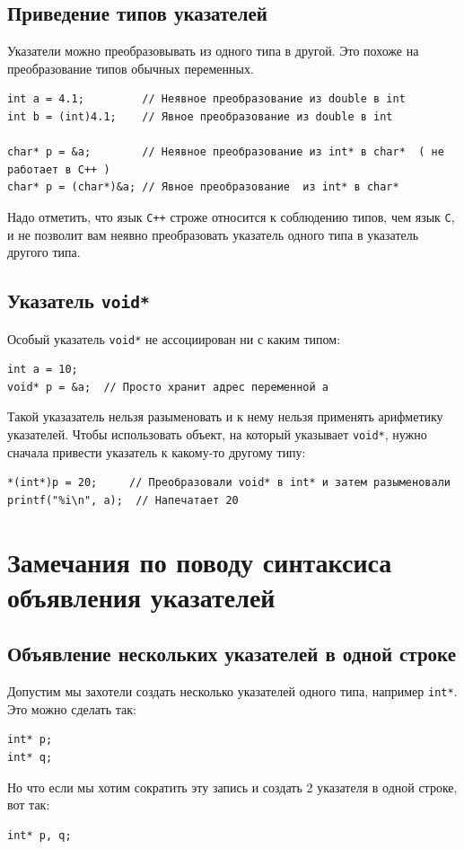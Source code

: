 \documentclass{article}
\begin{document}
\subsection*{Приведение типов указателей}
Указатели можно преобразовывать из одного типа в другой. Это похоже на преобразование типов обычных переменных.
\begin{lstlisting}
int a = 4.1;         // Неявное преобразование из double в int
int b = (int)4.1;    // Явное преобразование из double в int

char* p = &a;        // Неявное преобразование из int* в char*  ( не работает в C++ )
char* p = (char*)&a; // Явное преобразование  из int* в char*
\end{lstlisting}
Надо отметить, что язык \texttt{C++} строже относится к соблюдению типов, чем язык \texttt{C}, и не позволит вам неявно преобразовать указатель одного типа в указатель другого типа.


\subsection*{Указатель \texttt{void*}}
Особый указатель \texttt{void*} не ассоциирован ни с каким типом:
\begin{lstlisting}
int a = 10;
void* p = &a;  // Просто хранит адрес переменной a
\end{lstlisting}
Такой указазатель нельзя разыменовать и к нему нельзя применять арифметику указателей.
Чтобы использовать объект, на который указывает \texttt{void*}, нужно сначала привести указатель к какому-то другому типу:
\begin{lstlisting}
*(int*)p = 20;     // Преобразовали void* в int* и затем разыменовали
printf("%i\n", a);  // Напечатает 20
\end{lstlisting}



\newpage
\section*{Замечания по поводу синтаксиса объявления указателей}
\subsection*{Объявление нескольких указателей в одной строке}
Допустим мы захотели создать несколько указателей одного типа, например \texttt{int*}. Это можно сделать так:
\begin{lstlisting}
int* p;
int* q;
\end{lstlisting}
Но что если мы хотим сократить эту запись и создать 2 указателя в одной строке, вот так:
\begin{lstlisting}
int* p, q;
\end{lstlisting}
\end{document}
